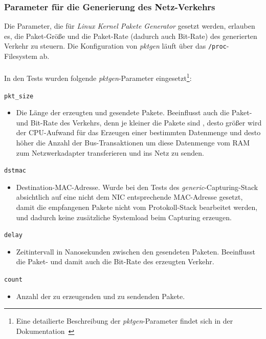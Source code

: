 {\subsubsection{Parameter für die Generierung des Netz-Verkehrs}
Die Parameter, die für \emph{Linux Kernel Pakete Generator} gesetzt werden, 
erlauben es, die Paket-Größe und die Paket-Rate (dadurch auch Bit-Rate)
des generierten Verkehr zu steuern. Die Konfiguration von \emph{pktgen}
läuft über das \verb+/proc+-Filesystem ab.\\\\
In den Tests wurden folgende \emph{pktgen}-Parameter
eingesetzt\footnote{Eine detailierte Beschreibung der \emph{pktgen}-Parameter findet sich in
der Dokumentation~\cite{linux_pktgen}}:
\begin{description}
\item \verb+pkt_size+	
	\begin{itemize}
		\item Die Länge der erzeugten und gesendete Pakete. Beeinflusst auch 
			die Paket- und Bit-Rate des Verkehrs, denn je kleiner die Pakete sind ,
			desto größer wird der CPU-Aufwand für das Erzeugen einer bestimmten Datenmenge
			und desto höher die Anzahl der Bus-Transaktionen um diese Datenmenge 
			vom RAM zum Netzwerkadapter transferieren und ins Netz zu senden.
	\end{itemize}
\item  \verb+dstmac+	
	\begin{itemize}
		\item  Destination-MAC-Adresse. Wurde bei den Tests des
			\emph{generic}-Capturing-Stack absichtlich auf eine nicht dem NIC
			entsprechende MAC-Adresse gesetzt, damit die empfangenen Pakete
			nicht vom Protokoll-Stack bearbeitet werden, und dadurch keine
			zusätzliche Systemload beim Capturing erzeugen. 
	\end{itemize}
\item  \verb+delay+
	\begin{itemize}
		\item Zeitintervall in Nanosekunden zwischen den gesendeten Paketen.
			Beeinflusst die Paket- und damit auch die Bit-Rate des erzeugten
			Verkehr.
	\end{itemize}
\item  \verb+count+
	\begin{itemize}
		\item Anzahl der zu erzeugenden und zu sendenden Pakete. 	
	\end{itemize}
\end{description}

}

